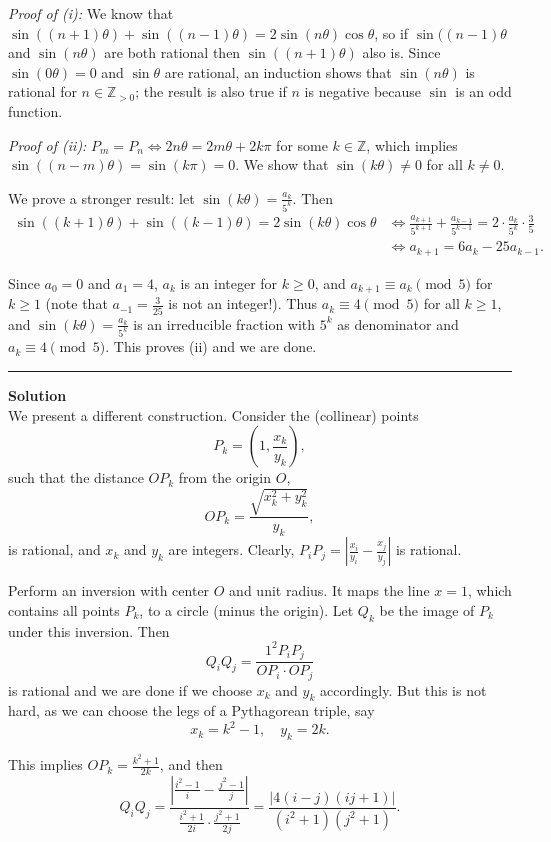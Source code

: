 \documentclass[12pt,oneside,a4paper]{book}
\newcounter{solnum}
\newcommand{\soln}{\stepcounter{solnum}\medskip\hrule\medbreak\textbf{Solution \thesolnum}\\}
\begin{document}
\smallskip
\emph{Proof of (i):} We know that $\sin((n+1)\theta) + \sin((n-1)\theta) = 2\sin(n\theta)\cos\theta$, so if $\sin((n-1)\theta$ and $\sin(n\theta)$ are both rational then $\sin((n+1)\theta)$ also is. Since $\sin(0\theta) = 0$ and $\sin\theta$ are rational, an induction shows that $\sin(n\theta)$ is rational for $n\in\mathbb{Z}_{>0}$; the result is also true if $n$ is negative because $\sin$ is an odd function.

\smallskip
\emph{Proof of (ii):} $P_m=P_n\iff 2n\theta=2m\theta + 2k\pi$ for some $k\in\mathbb{Z}$, which implies $\sin((n-m)\theta) = \sin(k\pi) = 0$. We show that $\sin(k\theta) \ne 0$ for all $k\ne 0$.

We prove a stronger result: let $\sin(k\theta) = \frac{a_k}{5^k}$. Then
\begin{align*}
\sin((k+1)\theta) + \sin((k-1)\theta) = 2\sin(k\theta)\cos\theta
&\iff \frac{a_{k+1}}{5^{k+1}} + \frac{a_{k-1}}{5^{k-1}} = 2\cdot \frac{a_k}{5^k}\cdot \frac35\\
&\iff a_{k+1} = 6a_k - 25a_{k-1}.
\end{align*}

Since $a_0=0$ and $a_1=4$, $a_k$ is an integer for $k\ge 0$, and $a_{k+1} \equiv a_k\pmod 5$ for $k\ge 1$ (note that $a_{-1} = \frac3{25}$ is not an integer!). Thus $a_k\equiv 4\pmod 5$ for all $k\ge 1$, and $\sin(k\theta) = \frac{a_k}{5^k}$ is an irreducible fraction with $5^k$ as denominator and $a_k\equiv 4\pmod 5$. This proves (ii) and we are done.

\soln
We present a different construction. Consider the (collinear) points
\[P_k = \left(1,\frac{x_k}{y_k}\right),\]
such that the distance $OP_k$ from the origin $O$,
\[OP_k = \frac{\sqrt{x_k^2+y_k^2}}{y_k},\]
is rational, and $x_k$ and $y_k$ are integers. Clearly, $P_iP_j = \left|\frac{x_i}{y_i} - \frac{x_j}{y_j}\right|$ is rational.

Perform an inversion with center $O$ and unit radius. It maps the line $x=1$, which contains all points $P_k$, to a circle (minus the origin). Let $Q_k$ be the image of $P_k$ under this inversion. Then
\[Q_iQ_j = \frac{1^2 P_iP_j}{OP_i\cdot OP_j}\]
is rational and we are done if we choose $x_k$ and $y_k$ accordingly. But this is not hard, as we can choose the legs of a Pythagorean triple, say
\[x_k = k^2-1,\quad y_k=2k.\]

This implies $OP_k = \frac{k^2+1}{2k}$, and then
\[Q_iQ_j = \frac{\left|\frac{i^2-1}i - \frac{j^2-1}j\right|}{\frac{i^2+1}{2i}\cdot\frac{j^2+1}{2j}} = \frac{|4(i-j)(ij+1)|}{(i^2+1)(j^2+1)}.\]
\end{document}
